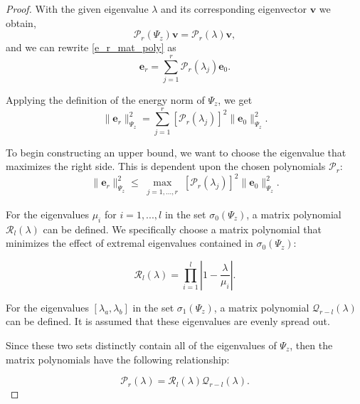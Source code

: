\documentclass[10pt,a4paper]{amsart}
\newcommand{\vect}[1]{\ensuremath{\bm{#1}}}
\begin{document}
\begin{proof}
With the given eigenvalue $\lambda$ and its corresponding eigenvector $\vect{v}$ we obtain,
\begin{equation}
\mathcal{P}_r(\Psi_{z})\vect{v}=\mathcal{P}_r(\lambda)\vect{v},
\end{equation}
and we can rewrite \eqref{e_r_mat_poly} as
\begin{equation}
\vect{e}_r= \sum_{j=1}^{r}\mathcal{P}_r(\lambda_j)\vect{e}_0.
\end{equation}

Applying the definition of the energy norm of $\Psi_{z}$, we get
\begin{equation}
    \| \vect{e}_r\|_{\Psi_{z}}^2 = \sum_{j=1}^{r} [\mathcal{P}_r(\lambda_j)]^2 \| \vect{e}_0\|_{\Psi_{z}}^2.
\end{equation}


To begin constructing an upper bound, we want to choose the eigenvalue that maximizes the right side.  This is dependent upon the chosen polynomials $\mathcal{P}_r$:
\begin{equation}
    \| \vect{e}_r\|_{\Psi_{z}}^2 \leq \max\limits_{\substack{j=1,...,r}} [\mathcal{P}_r(\lambda_j)]^2 \| \vect{e}_0\|_{\Psi_{z}}^2.
    \label{eq:constr_upper_bound}
\end{equation}

    For the eigenvalues $\mu_i$ for $i=1,...,l$ in the set $\sigma_0(\Psi_{z})$, a matrix polynomial $\mathcal{R}_l(\lambda)$ can be defined.  We specifically choose a matrix polynomial that minimizes the effect of extremal eigenvalues contained in $\sigma_0(\Psi_{z})$:

    \begin{equation}
    \mathcal{R}_l(\lambda) = \prod_{i=1}^{l} | 1-\frac{\lambda}{\mu_i}|.
    \label{eq: R_l}
    \end{equation}

    For the eigenvalues $[\lambda_a,\lambda_b]$ in the set $\sigma_1(\Psi_{z})$, a matrix polynomial $\mathcal{Q}_{r-l}(\lambda)$ can be defined.  It is assumed that these eigenvalues are evenly spread out.

    Since these two sets distinctly contain all of the eigenvalues of $\Psi_{z}$, then the matrix polynomials have the following relationship:

    \begin{equation}
    \mathcal{P}_r(\lambda) = \mathcal{R}_l(\lambda)\mathcal{Q}_{r-l}(\lambda).
    \end{equation}


\end{proof}
\end{document}
